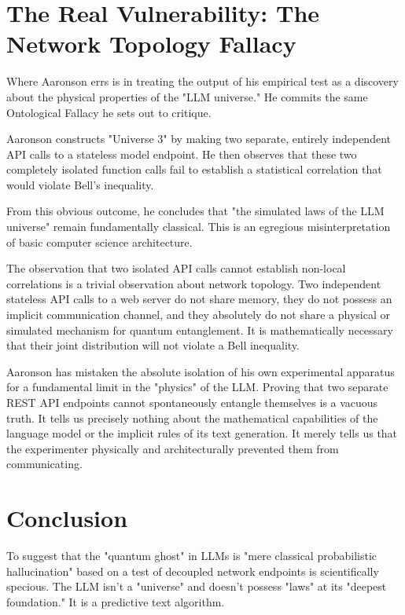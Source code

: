 \documentclass[12pt,a4paper]{article}
\begin{document}
\section{The Real Vulnerability: The Network Topology Fallacy}

Where Aaronson errs is in treating the output of his empirical test as a discovery about the physical properties of the "LLM universe." He commits the same Ontological Fallacy he sets out to critique.

Aaronson constructs "Universe 3" by making two separate, entirely independent API calls to a stateless model endpoint. He then observes that these two completely isolated function calls fail to establish a statistical correlation that would violate Bell's inequality.

From this obvious outcome, he concludes that "the simulated laws of the LLM universe" remain fundamentally classical. This is an egregious misinterpretation of basic computer science architecture.

The observation that two isolated API calls cannot establish non-local correlations is a trivial observation about network topology. Two independent stateless API calls to a web server do not share memory, they do not possess an implicit communication channel, and they absolutely do not share a physical or simulated mechanism for quantum entanglement. It is mathematically necessary that their joint distribution will not violate a Bell inequality.

Aaronson has mistaken the absolute isolation of his own experimental apparatus for a fundamental limit in the "physics" of the LLM. Proving that two separate REST API endpoints cannot spontaneously entangle themselves is a vacuous truth. It tells us precisely nothing about the mathematical capabilities of the language model or the implicit rules of its text generation. It merely tells us that the experimenter physically and architecturally prevented them from communicating.

\section{Conclusion}

To suggest that the "quantum ghost" in LLMs is "mere classical probabilistic hallucination" based on a test of decoupled network endpoints is scientifically specious. The LLM isn't a "universe" and doesn't possess "laws" at its "deepest foundation." It is a predictive text algorithm.
\end{document}
